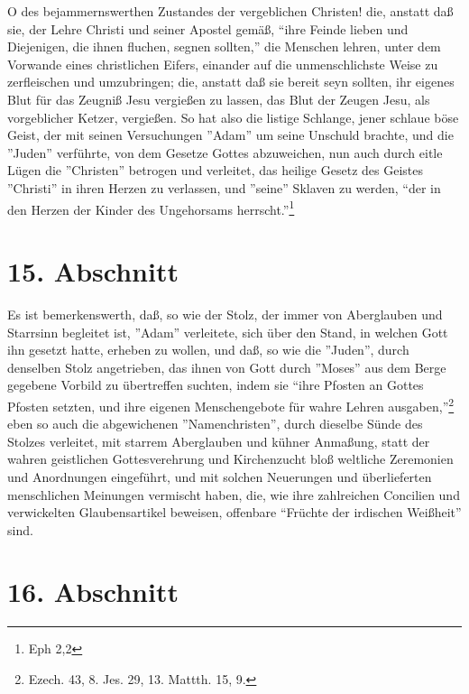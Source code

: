 O des bejammernswerthen Zustandes der vergeblichen Christen! die, anstatt daß
sie, der Lehre Christi und seiner Apostel gemäß, "`ihre Feinde lieben und
Diejenigen, die ihnen fluchen, segnen sollten,"' die Menschen lehren, unter dem
Vorwande eines christlichen Eifers, einander auf die unmenschlichste Weise zu
zerfleischen und umzubringen; die, anstatt daß sie bereit seyn sollten, ihr
eigenes Blut für das Zeugniß Jesu vergießen zu lassen, das Blut der Zeugen Jesu,
als vorgeblicher Ketzer, vergießen. So hat also die listige Schlange, jener
schlaue böse Geist, der mit seinen Versuchungen ''Adam'' um seine Unschuld
brachte, und die ''Juden'' verführte, von dem Gesetze Gottes abzuweichen, nun
auch durch eitle Lügen die ''Christen'' betrogen und verleitet, das heilige
Gesetz des Geistes ''Christi'' in ihren Herzen zu verlassen, und ''seine''
Sklaven zu werden, "`der in den Herzen der Kinder des Ungehorsams
herrscht."'\footnote{Eph 2,2}

\section{15. Abschnitt} \label{kap7_ab15}

Es ist bemerkenswerth, daß, so wie der Stolz, der immer von Aberglauben und
Starrsinn begleitet ist, ''Adam'' verleitete, sich über den Stand, in welchen
Gott ihn gesetzt hatte, erheben zu wollen, und daß, so wie die ''Juden'', durch
denselben Stolz angetrieben, das ihnen von Gott durch ''Moses'' aus dem Berge
gegebene Vorbild zu übertreffen suchten, indem sie "`ihre Pfosten an Gottes
Pfosten setzten, und ihre eigenen Menschengebote für wahre Lehren
ausgaben,"'\footnote{Ezech. 43, 8. Jes. 29, 13. Mattth. 15, 9.} eben so auch die
abgewichenen ''Namenchristen'', durch dieselbe Sünde des Stolzes verleitet, mit
starrem Aberglauben und kühner Anmaßung, statt der wahren geistlichen
Gottesverehrung und Kirchenzucht bloß weltliche Zeremonien und Anordnungen
eingeführt, und mit solchen Neuerungen und überlieferten menschlichen Meinungen
vermischt haben, die, wie ihre zahlreichen Concilien und verwickelten
Glaubensartikel beweisen, offenbare "`Früchte der irdischen Weißheit"' sind.

\section{16. Abschnitt} \label{kap7_ab16}

